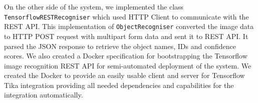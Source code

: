 
On the other side of the system, we implemented the class \texttt{TensorflowRESTRecogniser} which used HTTP Client to communicate with the REST API. This implementation of \texttt{ObjectRecogniser} converted the image data to HTTP POST request with multipart form data and sent it to REST API. It parsed the JSON response to retrieve the object names, IDs and confidence scores. We also created a Docker specification for bootstrapping the Tensorflow image recognition REST API for semi-automated deployment of the system. We created the Docker to provide an easily usable client and server for Tensorflow Tika integration providing all needed dependencies and capabilities for the integration automatically.

